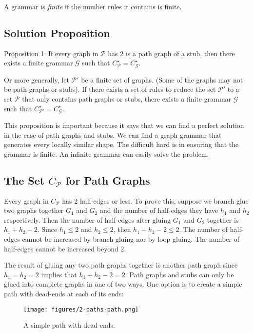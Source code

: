 \documentclass[acmtog]{acmart}
\begin{document}
A grammar is \textit{finite} if the number rules it contains is finite.

\subsection{Solution Proposition}

Proposition 1: If every graph in $\mathcal{P}$ has 2 is a path graph of a stub,
then there exists a finite grammar $\mathcal{G}$ such that
$C^{\star}_{\mathcal{P}} = C^{\star}_{\mathcal{G}}$.

Or more generally, let $\mathcal{P}'$ be a finite set of graphs. (Some of the
graphs may not be path graphs or stubs). If there exists a set of rules to
reduce the set $\mathcal{P}'$ to a set $\mathcal{P}$ that only contains path
graphs or stubs, there exists a finite grammar $\mathcal{G}$ such that
$C^{\star}_{\mathcal{P'}} = C^{\star}_{\mathcal{G}}$.

This proposition is important because it says that we can find a perfect
solution in the case of path graphs and stubs. We can find a graph grammar that
generates every locally similar shape. The difficult hard is in ensuring that
the grammar is finite. An infinite grammar can easily solve the problem.

\subsection{The Set $C_{\mathcal{P}}$ for Path Graphs}

Every graph in $C_{\mathcal{P}}$ has 2 half-edges or less. To prove this,
suppose we branch glue two graphs together $G_1$ and $G_2$ and the number of
half-edges they have $h_1$ and $h_2$ respectively. Then the number of
half-edges after gluing $G_1$ and $G_2$ together is $h_1 + h_2 - 2$. Since
$h_1 \leq 2$ and $h_2 \leq 2$, then $h_1 + h_2 - 2 \leq 2$. The number of
half-edges cannot be increased by branch gluing nor by loop gluing. The number
of half-edges cannot be increased beyond 2.

The result of gluing any two path graphs together is another path graph since
$h_1 = h_2 = 2$ implies that $h_1 + h_2 - 2 = 2$. Path graphs and stubs can only
be glued into complete graphs in one of two ways. One option is to create a
simple path with dead-ends at each of its ends:

\begin{figure}[H]
\centering
\texttt{[image: figures/2-paths-path.png]}
\caption{A simple path with dead-ends.}
\label{stub path}
\end{figure}
\end{document}
